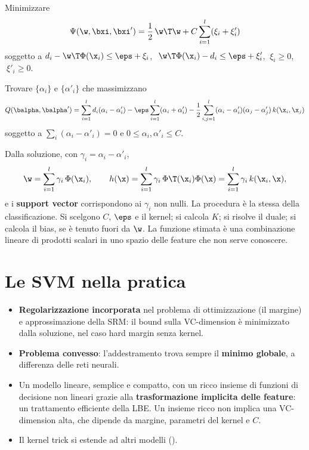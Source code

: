 \begin{definizione}
Minimizzare
\[
\Psi(\w,\bxi,\bxi') = \frac12\,\w\T\w + C\sum_{i=1}^{l}(\xi_i+\xi'_i)
\]
soggetto a $d_i - \w\T\Phi(\x_i)\le\eps+\xi_i$, $\ \w\T\Phi(\x_i)-d_i\le\eps+\xi'_i$, $\ \xi_i\ge0$, $\ \xi'_i\ge0$.
\end{definizione}

\begin{definizione}
Trovare $\{\alpha_i\}$ e $\{\alpha'_i\}$ che massimizzano
\[
Q(\balpha,\balpha') = \sum_{i=1}^{l}d_i(\alpha_i-\alpha'_i) - \eps\sum_{i=1}^{l}(\alpha_i+\alpha'_i)
- \frac12\sum_{i,j=1}^{l}(\alpha_i-\alpha'_i)(\alpha_j-\alpha'_j)\,k(\x_i,\x_j)
\]
soggetto a $\sum_i(\alpha_i-\alpha'_i) = 0$ e $0\le\alpha_i,\alpha'_i\le C$.
\end{definizione}

Dalla soluzione, con $\gamma_i = \alpha_i-\alpha'_i$,
\[
\w = \sum_{i=1}^{l}\gamma_i\,\Phi(\x_i),\qquad h(\x) = \sum_{i=1}^{l}\gamma_i\,\Phi\T(\x_i)\Phi(\x) = \sum_{i=1}^{l}\gamma_i\,k(\x_i,\x),
\]
e i \textbf{support vector} corrispondono ai $\gamma_i$ non nulli. La procedura è la stessa della classificazione.
Si scelgono $C$, $\eps$ e il kernel; si calcola $K$; si risolve il duale; si calcola il bias, se è tenuto fuori da
$\w$. La funzione stimata è una combinazione lineare di prodotti scalari in uno spazio delle feature che non serve
conoscere.

\section{Le SVM nella pratica}

\begin{idea}[Pregi]
\begin{itemize}
  \item \textbf{Regolarizzazione incorporata} nel problema di ottimizzazione (il margine) e approssimazione della SRM:
        il bound sulla VC-dimension è minimizzato dalla soluzione, nel caso hard margin senza kernel.
  \item \textbf{Problema convesso}: l'addestramento trova sempre il \textbf{minimo globale}, a differenza delle reti
        neurali.
  \item Un modello lineare, semplice e compatto, con un ricco insieme di funzioni di decisione non lineari grazie alla
        \textbf{trasformazione implicita delle feature}: un trattamento efficiente della LBE. Un insieme ricco non
        implica una VC-dimension alta, che dipende da margine, parametri del kernel e $C$.
  \item Il kernel trick si estende ad altri modelli ().
\end{itemize}
\end{idea}

